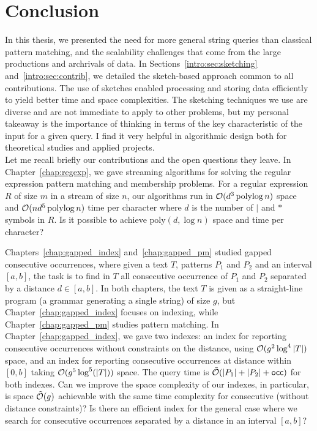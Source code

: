 \clearemptydoublepage
{}
\chapter*{Conclusion}
In this thesis, we presented the need for more general string queries than classical pattern matching, and the scalability challenges that come from the large productions and archrivals of data.
%
In Sections~\ref*{intro:sec:sketching} and~\ref*{intro:sec:contrib}, we detailed the sketch-based approach common to all contributions. The use of sketches enabled processing and storing data efficiently to yield better time and space complexities.
%
The sketching techniques we use are diverse and are not immediate to apply to other problems, but my personal takeaway is the importance of thinking in terms of the key characteristic of the input for a given query. I find it very helpful in algorithmic design both for theoretical studies and applied projects.\\


Let me recall briefly our contributions and the open questions they leave. 
In Chapter~\ref{chap:regexp}, we gave streaming algorithms for solving the regular expression pattern matching and membership problems. For a regular expression $R$ of size $m$ in a stream of size $n$, our algorithms run in $\mathcal{O}(d^3 \operatorname{polylog} n)$ space and $\mathcal{O}(nd^5\operatorname{polylog} n)$ time per character where $d$ is the number of $|$ and $\ast$ symbols in $R$. Is it possible to achieve $\mathrm{poly}(d,\log n)$ space and time per character?

Chapters~\ref{chap:gapped_index} and~\ref{chap:gapped_pm} studied gapped consecutive occurrences, where given a text $T$,  patterns $P_1$ and $P_2$ and an interval $[a,b]$, the task is to find in $T$ all consecutive occurrence of $P_1$ and $P_2$ separated by a distance $d \in [a,b]$. In both chapters, the text $T$ is given as a straight-line program (a grammar generating a single string) of size $g$, but Chapter~\ref{chap:gapped_index} focuses on indexing, while Chapter~\ref{chap:gapped_pm} studies pattern matching. In Chapter~\ref{chap:gapped_index}, we gave two indexes: an index for reporting consecutive occurrences without constraints on the distance, using $\mathcal{O}(g^2\log^4|T|)$ space, and an index for reporting consecutive occurrences at distance within $[0,b]$ taking $\mathcal{O} (g^5\log^5(|T|))$ space. The query time is $\tilde{\mathcal{O}}(|P_1|+|P_2|+\mathsf{occ})$ for both indexes. 
%
Can we improve the space complexity of our indexes, in particular, is space $\tilde{\mathcal{O}}(g)$ achievable with the same time complexity for consecutive (without distance constraints)? Is there an efficient index for the general case where we search for consecutive occurrences separated by a distance in an interval $[a,b]$?

